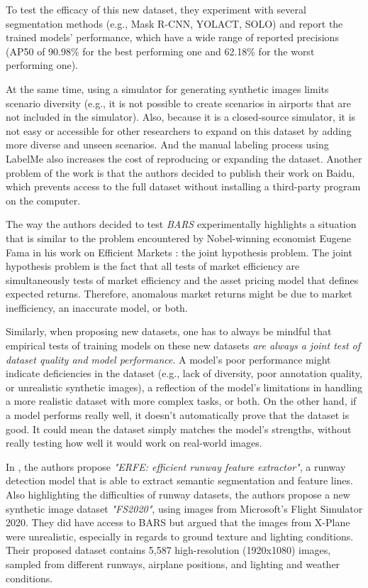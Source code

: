 To test the efficacy of this new dataset, they experiment with several segmentation methods (e.g., Mask R-CNN, YOLACT, SOLO) and report the trained models' performance, which have a wide range of reported precisions (AP50 of 90.98\% for the best performing one and 62.18\% for the worst performing one).

At the same time, using a simulator for generating synthetic images limits
scenario diversity (e.g., it is not possible to create scenarios in airports that
are not included in the simulator). Also, because it is a closed-source
simulator, it is not easy or accessible for other researchers to expand on this
dataset by adding more diverse and unseen scenarios. And the manual labeling
process using LabelMe \cite{mit_labelme_nodate} also increases the cost of
reproducing or expanding the dataset. Another problem of the work is that the
authors decided to publish their work on Baidu, which prevents access to the
full dataset without installing a third-party program on the computer.

The way the authors decided to test \emph{BARS} experimentally highlights a situation that is similar to the problem encountered by Nobel-winning economist Eugene Fama in his work on Efficient Markets \cite{fama_efficient_1970}: the joint hypothesis problem. The joint hypothesis problem is the fact that all tests of market efficiency are simultaneously tests of market efficiency and the asset pricing model that defines expected returns. Therefore, anomalous market returns might be due to market inefficiency, an inaccurate model, or both. 

\label{sec:joint_hypothesis}
Similarly, when proposing new datasets, one has to always be mindful that
empirical tests of training models on these new datasets \emph{are always a joint test of dataset quality and model performance}. A model's poor performance might indicate deficiencies in the dataset (e.g., lack of diversity, poor annotation quality, or unrealistic synthetic images), a reflection of the model's limitations in handling a more realistic dataset with more complex tasks, or both. On the other hand, if a model performs really well, it doesn't automatically prove that the dataset is good. It could mean the dataset simply matches the model's strengths, without really testing how well it would work on real-world images.

In \cite{chen_image-based_2024}, the authors propose \emph{"ERFE: efficient
runway feature extractor"}, a runway detection model that is able to extract
semantic segmentation and feature lines. Also highlighting the difficulties of
runway datasets, the authors propose a new synthetic image dataset
\emph{"FS2020"}, using images from Microsoft's Flight Simulator 2020. They did have access to BARS but argued that the images from X-Plane were unrealistic, especially in regards to ground texture and lighting conditions. Their proposed dataset contains 5,587 high-resolution (1920x1080) images, sampled from different runways, airplane positions, and lighting and weather conditions.

